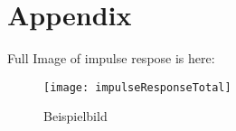 \section{Appendix}\label{Appendix}
Full Image of impulse respose is here:
\begin{figure}[H]
    \centering
    \caption[]{Beispielbild}
	\label{fig:Beispielbild}
    \texttt{[image: impulseResponseTotal]}
\end{figure}